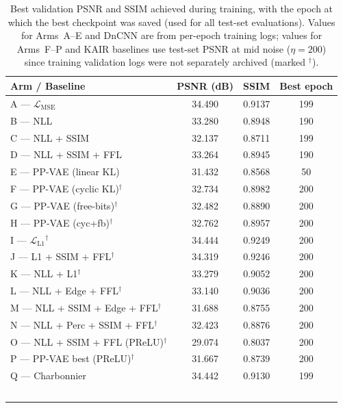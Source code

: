 \documentclass[12pt, a4paper, twoside, openright]{book}
\begin{document}
\begin{table}[htbp]
\centering
\small
\caption[Final training metrics per ablation arm]{Best validation PSNR and SSIM achieved during training, with the epoch at which the best checkpoint was saved (used for all test-set evaluations). Values for Arms~A--E and DnCNN are from per-epoch training logs; values for Arms~F--P and KAIR baselines use test-set PSNR at mid noise ($\eta=200$) since training validation logs were not separately archived (marked $^\dagger$).}
\label{tab:results:training}
\begin{tabular}{lccc}
\toprule
\textbf{Arm / Baseline} & \textbf{PSNR (dB)} & \textbf{SSIM} & \textbf{Best epoch} \\
\midrule
A — $\mathcal{L}_{\mathrm{MSE}}$        & 34.490 & 0.9137 & 199 \\
B — NLL                                  & 33.280 & 0.8948 & 190 \\
C — NLL + SSIM                           & 32.137 & 0.8711 & 199 \\
D — NLL + SSIM + FFL                     & 33.264 & 0.8945 & 190 \\
E — PP-VAE (linear KL)                   & 31.432 & 0.8568 & 50  \\
\midrule
F — PP-VAE (cyclic KL)$^\dagger$          & 32.734 & 0.8982 & 200 \\
G — PP-VAE (free-bits)$^\dagger$          & 32.482 & 0.8890 & 200 \\
H — PP-VAE (cyc+fb)$^\dagger$             & 32.762 & 0.8957 & 200 \\
I — $\mathcal{L}_{\mathrm{L1}}$$^\dagger$ & 34.444 & 0.9249 & 200 \\
J — L1 + SSIM + FFL$^\dagger$             & 34.319 & 0.9246 & 200 \\
K — NLL + L1$^\dagger$                    & 33.279 & 0.9052 & 200 \\
L — NLL + Edge + FFL$^\dagger$            & 33.140 & 0.9036 & 200 \\
M — NLL + SSIM + Edge + FFL$^\dagger$     & 31.688 & 0.8755 & 200 \\
N — NLL + Perc + SSIM + FFL$^\dagger$     & 32.423 & 0.8876 & 200 \\
O — NLL + SSIM + FFL (PReLU)$^\dagger$    & 29.074 & 0.8037 & 200 \\
P — PP-VAE best (PReLU)$^\dagger$          & 31.667 & 0.8739 & 200 \\
Q — Charbonnier                            & 34.442 & 0.9130 & 199 \\
$$
\end{tabular}
\end{table}
\end{document}
